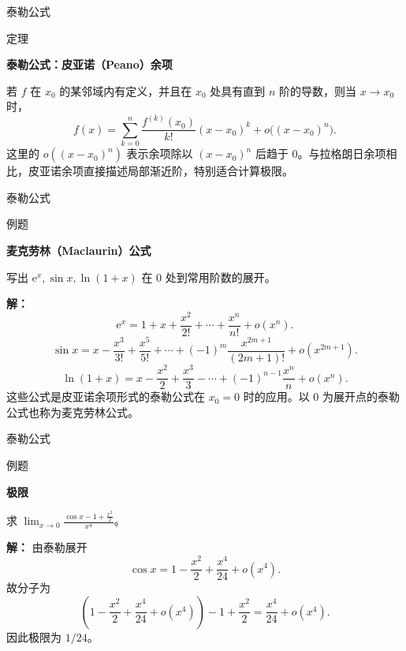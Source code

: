 \documentclass[aspectratio=169,10pt,fontset=fandol]{ctexbeamer}
\newcommand{\ee}{\mathrm{e}}
\begin{document}
\begin{frame}[t,fragile]{泰勒公式}
\normalsize
\begin{block}{定理}
{\normalsize
\textbf{泰勒公式：皮亚诺（Peano）余项}\par

若 \(f\) 在 \(x_0\) 的某邻域内有定义，并且在 \(x_0\) 处具有直到 \(n\) 阶的导数，则当 \(x\to x_0\) 时，
\[
f(x)=\sum_{k=0}^{n}\frac{f^{(k)}(x_0)}{k!}(x-x_0)^k
+o\bigl((x-x_0)^n\bigr).
\]
这里的 \(o((x-x_0)^n)\) 表示余项除以 \((x-x_0)^n\) 后趋于 \(0\)。与拉格朗日余项相比，皮亚诺余项直接描述局部渐近阶，特别适合计算极限。

}
\end{block}
\end{frame}
\begin{frame}[t,fragile]{泰勒公式}
\normalsize
\begin{block}{例题}
{\normalsize
\textbf{麦克劳林（Maclaurin）公式}\par

写出 $\ee^x,\sin x,\ln(1+x)$ 在 $0$ 处到常用阶数的展开。

}
\end{block}
\pause
{\normalsize
\textbf{解：}
\[
\ee^x=1+x+\frac{x^2}{2!}+\cdots+\frac{x^n}{n!}+o(x^n).
\]
\[
\sin x=x-\frac{x^3}{3!}+\frac{x^5}{5!}+\cdots+(-1)^m\frac{x^{2m+1}}{(2m+1)!}+o(x^{2m+1}).
\]
\[
\ln(1+x)=x-\frac{x^2}{2}+\frac{x^3}{3}-\cdots+(-1)^{n-1}\frac{x^n}{n}+o(x^n).
\]
这些公式是皮亚诺余项形式的泰勒公式在 \(x_0=0\) 时的应用。以 \(0\) 为展开点的泰勒公式也称为麦克劳林公式。

}
\end{frame}
\begin{frame}[t,fragile]{泰勒公式}
\normalsize
\begin{block}{例题}
{\normalsize
\textbf{极限}\par

求 $\displaystyle\lim_{x\to0}\frac{\cos x-1+\frac{x^2}{2}}{x^4}$。

}
\end{block}
\pause
{\normalsize
\textbf{解：}
由泰勒展开
\[
\cos x=1-\frac{x^2}{2}+\frac{x^4}{24}+o(x^4).
\]
故分子为
\[
\left(1-\frac{x^2}{2}+\frac{x^4}{24}+o(x^4)\right)-1+\frac{x^2}{2}
=\frac{x^4}{24}+o(x^4).
\]
因此极限为 $1/24$。

}
\end{frame}
\end{document}
